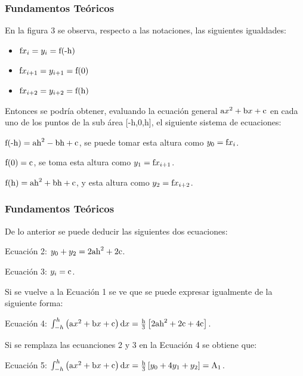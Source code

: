 \documentclass{beamer}
\begin{document}
\begin{frame}
\frametitle{Fundamentos Teóricos}
	En la figura 3 se observa, respecto a las notaciones, las siguientes igualdades:
	
	\begin{itemize}
    \item $ \textup{f}x_{i}=y_{i}=\textup{f}\textup{(-h)} $
    \pause
    \item $ \textup{f}x_{i+1}=y_{i+1}=\textup{f}(0) $
    \pause
    \item $ \textup{f}x_{i+2}=y_{i+2}=\textup{f}\textup{(h)} $
    \pause
    \end{itemize}


    Entonces se podría obtener, evaluando la ecuación general $ \textup{a}x^2 + \textup{b}x + \textup{c} $ en cada uno de los puntos de la sub área [-h,0,h], el siguiente sistema de ecuaciones:
	
	$ \textup{f}\textup{(-h)}=\textup{a}\textup{h}^2 - \textup{b}\textup{h} + \textup{c} $, se puede tomar esta altura como 
	$ y_{0}=\textup{f}x_{i}$.
	
	
	$ \textup{f}(0)=\textup{c} $, se toma esta altura como $ y_{1}=\textup{f}x_{i+1} $.
	
	
	$ \textup{f}\textup{(h)}=\textup{a}\textup{h}^2 + \textup{b}\textup{h} + \textup{c} $, y esta altura como $ 
	y_{2}=\textup{f}x_{i+2}$.

\end{frame}

\begin{frame}
\frametitle{Fundamentos Teóricos}
	De lo anterior se puede deducir las siguientes dos ecuaciones:

	
	Ecuación 2: $ y_{0} + y_{2} = 2\textup{a}\textup{h}^2 + 2\textup{c} $.

	
	Ecuación 3: $ y_{i}=\textup{c} $.

	
	Si se vuelve a la Ecuación 1 se ve que se puede expresar igualmente de la siguiente forma:
	
	Ecuación 4: $ \int_{-h}^{h}\left(\textup{a}x^2 + \textup{b}x + \textup{c}\right)\textup{d}x = \frac{\textup{h}}
	{3}\left[2\textup{a}\textup{h}^2 + 2\textup{c} + 4\textup{c}\right] $.

		
	Si se remplaza las ecuanciones 2 y 3 en la Ecuación 4 se obtiene que:

	
	Ecuación 5: $ \int_{-h}^{h}\left(\textup{a}x^2 + \textup{b}x + \textup{c}\right)\textup{d}x = \frac{\textup{h}}{3}\left[y_{0} + 
	4y_{1} + y_{2}\right] = \textup{A}_{1}  $.

\end{frame}
\end{document}
